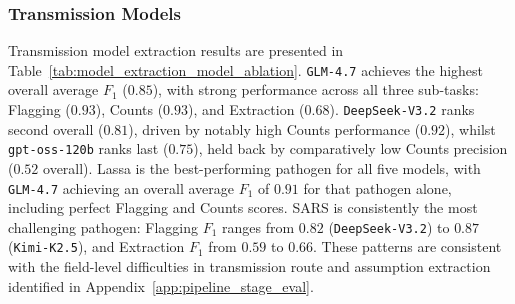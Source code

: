 \subsubsection*{Transmission Models}
Transmission model extraction results are presented in Table~\ref{tab:model_extraction_model_ablation}. \texttt{GLM-4.7} achieves the highest overall average $F_1$ ($0.85$), with strong performance across all three sub-tasks: Flagging ($0.93$), Counts ($0.93$), and Extraction ($0.68$). \texttt{DeepSeek-V3.2} ranks second overall ($0.81$), driven by notably high Counts performance ($0.92$), whilst \texttt{gpt-oss-120b} ranks last ($0.75$), held back by comparatively low Counts precision ($0.52$ overall). Lassa is the best-performing pathogen for all five models, with \texttt{GLM-4.7} achieving an overall average $F_1$ of $0.91$ for that pathogen alone, including perfect Flagging and Counts scores. SARS is consistently the most challenging pathogen: Flagging $F_1$ ranges from $0.82$ (\texttt{DeepSeek-V3.2}) to $0.87$ (\texttt{Kimi-K2.5}), and Extraction $F_1$ from $0.59$ to $0.66$. These patterns are consistent with the field-level difficulties in transmission route and assumption extraction identified in Appendix~\ref{app:pipeline_stage_eval}.


\clearpage


